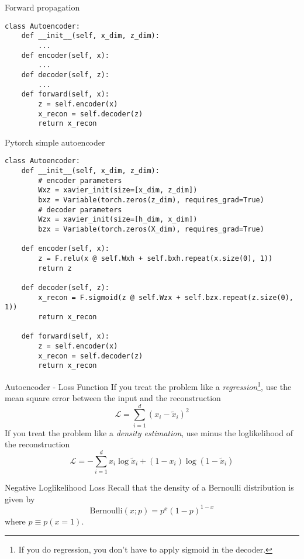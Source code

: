 \documentclass{beamer}
\newcommand{\bernoulli}{\mathrm{Bernoulli}}
\begin{document}
\begin{frame}[fragile]{Forward propagation}
\begin{verbatim}
class Autoencoder:
    def __init__(self, x_dim, z_dim):
        ...
    def encoder(self, x):
        ...
    def decoder(self, z):
        ...
    def forward(self, x):
        z = self.encoder(x)
        x_recon = self.decoder(z)
        return x_recon
\end{verbatim}
\end{frame}

\begin{frame}[fragile]{Pytorch simple autoencoder}
\begin{verbatim}
class Autoencoder:
    def __init__(self, x_dim, z_dim):
        # encoder parameters
        Wxz = xavier_init(size=[x_dim, z_dim])
        bxz = Variable(torch.zeros(z_dim), requires_grad=True)
        # decoder parameters
        Wzx = xavier_init(size=[h_dim, x_dim])
        bzx = Variable(torch.zeros(X_dim), requires_grad=True)
    
    def encoder(self, x):
        z = F.relu(x @ self.Wxh + self.bxh.repeat(x.size(0), 1))
        return z
    
    def decoder(self, z):
        x_recon = F.sigmoid(z @ self.Wzx + self.bzx.repeat(z.size(0), 1))
        return x_recon
    
    def forward(self, x):
        z = self.encoder(x)
        x_recon = self.decoder(z)
        return x_recon
\end{verbatim}
\end{frame}

\begin{frame}{Autoencoder - Loss Function}
If you treat the problem like a \textit{regression}\footnote{If you do regression, you don't have to apply sigmoid in the decoder.}, use the mean square error between the input and the reconstruction
\begin{equation}
	\mathcal{L} = \sum_{i=1}^d (x_i-\tilde{x}_i)^2
\end{equation}
If you treat the problem like a \textit{density estimation}, use minus the loglikelihood of the reconstruction
\begin{equation}
\mathcal{L} = -\sum_{i=1}^d x_i\log\tilde{x}_i + (1-x_i)\log(1-\tilde{x}_i) 
\end{equation}
\end{frame}

\begin{frame}{Negative Loglikelihood Loss}
Recall that the density of a Bernoulli distribution is given by 
\begin{equation}
\bernoulli(x;p) = p^x(1-p)^{1-x}
\end{equation}
where $p\equiv p(x=1)$.
\end{frame}
\end{document}
